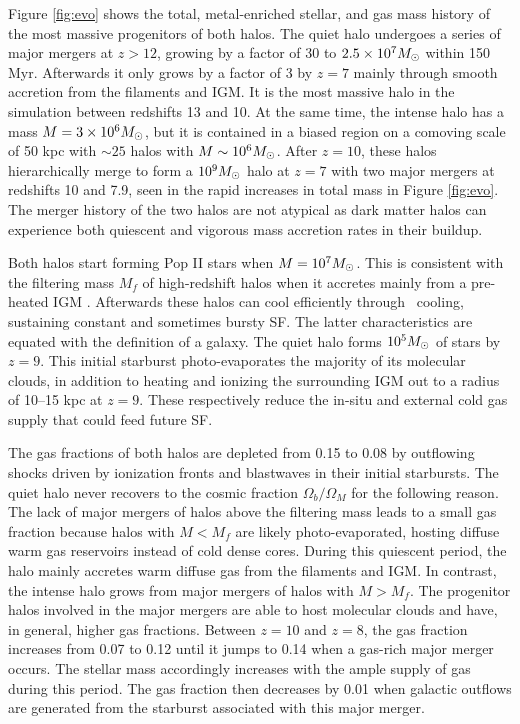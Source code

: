\documentclass[apjl]{emulateapj}
\begin{document}
Figure \ref{fig:evo} shows the total, metal-enriched stellar, and gas
mass history of the most massive progenitors of both halos.  The quiet
halo undergoes a series of major mergers at $z > 12$, growing by a
factor of 30 to $2.5 \times 10^7 \Ms$ within 150 Myr.  Afterwards it
only grows by a factor of 3 by $z=7$ mainly through smooth accretion
from the filaments and IGM.  It is the most massive halo in the
simulation between redshifts 13 and 10.  At the same time, the intense
halo has a mass $M = 3 \times 10^6 \Ms$, but it is contained in a
biased region on a comoving scale of 50 kpc with $\sim25$ halos with
$M \sim 10^6 \Ms$.  After $z=10$, these halos hierarchically merge to
form a $10^9 \Ms$ halo at $z=7$ with two major mergers at redshifts 10
and 7.9, seen in the rapid increases in total mass in Figure
\ref{fig:evo}.  The merger history of the two halos are not atypical
as dark matter halos can experience both quiescent and vigorous mass
accretion rates in their buildup.

Both halos start forming Pop II stars when $M = 10^7 \Ms$.  This is
consistent with the filtering mass $M_f$ of high-redshift halos when
it accretes mainly from a pre-heated IGM \citep{gnedin98, gnedin00,
  Wise08_Gal}.  Afterwards these halos can cool efficiently through
\hh~cooling, sustaining constant and sometimes bursty SF.  The latter
characteristics are equated with the definition of a galaxy.  The
quiet halo forms $10^5 \Ms$ of stars by $z=9$.  This initial starburst
photo-evaporates the majority of its molecular clouds, in addition to
heating and ionizing the surrounding IGM out to a radius of 10--15 kpc
at $z=9$.  These respectively reduce the in-situ and external cold gas
supply that could feed future SF.

The gas fractions of both halos are depleted from 0.15 to 0.08 by
outflowing shocks driven by ionization fronts and blastwaves in their
initial starbursts.  The quiet halo never recovers to the cosmic
fraction $\Omega_b/\Omega_M$ for the following reason.  The lack of
major mergers of halos above the filtering mass leads to a small gas
fraction because halos with $M < M_f$ are likely photo-evaporated,
hosting diffuse warm gas reservoirs instead of cold dense cores.
During this quiescent period, the halo mainly accretes warm diffuse
gas from the filaments and IGM.  In contrast, the intense halo grows
from major mergers of halos with $M > M_f$.  The progenitor halos
involved in the major mergers are able to host molecular clouds and
have, in general, higher gas fractions.  Between $z=10$ and $z=8$, the
gas fraction increases from 0.07 to 0.12 until it jumps to 0.14 when a
gas-rich major merger occurs.  The stellar mass accordingly increases
with the ample supply of gas during this period.  The gas fraction
then decreases by 0.01 when galactic outflows are generated from the
starburst associated with this major merger.
\end{document}
